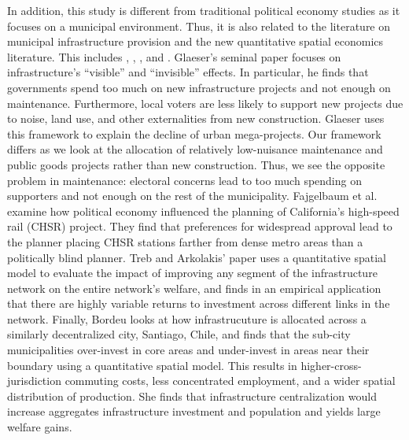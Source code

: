 In addition, this study is different from traditional political economy studies as it focuses on a municipal environment. 
Thus, it is also related to the literature on municipal infrastructure provision and the new quantitative spatial economics literature.
This includes \cite{Glaeser2018political}, \cite{Fajgelbaum2023}, \cite{treb_arkolakis_2022_infrastructure}, and \cite{bordeu2023commuting}.
Glaeser's seminal paper focuses on infrastructure's ``visible'' and ``invisible'' effects. 
In particular, he finds that governments spend too much on new infrastructure projects and not enough on maintenance.
Furthermore, local voters are less likely to support new projects due to noise, land use, and other externalities from new construction.
Glaeser uses this framework to explain the decline of urban mega-projects.
Our framework differs as we look at the allocation of relatively low-nuisance maintenance and public goods projects rather than new construction.
Thus, we see the opposite problem in maintenance: electoral concerns lead to too much spending on supporters and not enough on the rest of the municipality.
Fajgelbaum et al. examine how political economy influenced the planning of California's high-speed rail (CHSR) project.
They find that preferences for widespread approval lead to the planner placing CHSR stations farther from dense metro areas than a politically blind planner.
Treb and Arkolakis' paper uses a quantitative spatial model to evaluate the impact of improving any segment of the infrastructure network on the entire network's welfare, and finds in an empirical application that there are highly variable returns to investment across different links in the network.
Finally, Bordeu looks at how infrastrucuture is allocated across a similarly decentralized city, Santiago, Chile, and finds that the sub-city municipalities over-invest in core areas and under-invest in areas near their boundary using a quantitative spatial model.
This results in higher-cross-jurisdiction commuting costs, less concentrated employment, and a wider spatial distribution of production.
She finds that infrastructure centralization would increase aggregates infrastructure investment and population and yields large welfare gains.

